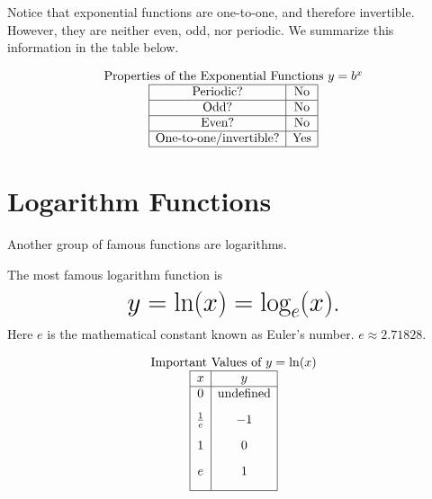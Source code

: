 \documentclass[nooutcomes]{ximera}
\begin{document}
Notice that exponential functions are one-to-one, and therefore invertible. However, they are neither even, odd, nor periodic. We summarize this information in the table below.

\[
\begin{array}{c}
 \text{\normalfont Properties of the Exponential Functions } y=b^x \\
\begin{array}{|c|c|}
\hline
\text{Periodic?} & \text{No} \\ \hline
\text{Odd?} & \text{No} \\ \hline
\text{Even?} & \text{No} \\ \hline
\text{One-to-one/invertible?} & \text{Yes} \\ \hline
\end{array}
\end{array}
 \]



\newpage


\section{Logarithm Functions}
Another group of famous functions are logarithms.

\begin{example}
The most famous logarithm function is
 $$ \mbox{\huge $y=\ln(x)=\log_{e}(x)$.}$$ 
Here $e$ is the mathematical constant known as Euler's number. $e \approx 2.71828$.

\begin{center}
\end{center}


\[
\begin{array}{ c  }
  \text{Important Values of $y=\ln(x)$}\\
 \begin{array}{|c|c|}
 \hline
 x & y\\
 \hline
0&\text{undefined}\\[2ex]
\frac{1}{e}&-1\\[2ex]
1&0\\[2ex]
e&1\\[2ex]
 \hline
 \end{array}
\end{array}
 \]

\end{example}
\end{document}
